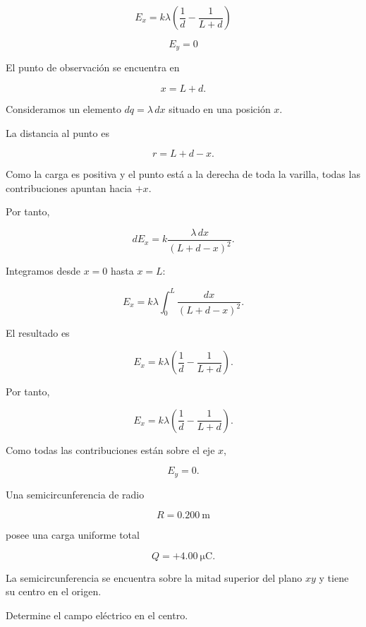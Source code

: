 \begin{respuesta}

\[
\boxed{
E_x=k\lambda\left(\frac{1}{d}-\frac{1}{L+d}\right)
}
\]

\[
\boxed{E_y=0}
\]

\end{respuesta}

\begin{explicacion}

El punto de observación se encuentra en

\[
x=L+d.
\]

Consideramos un elemento \(dq=\lambda\,dx\) situado en una posición \(x\).

La distancia al punto es

\[
r=L+d-x.
\]

Como la carga es positiva y el punto está a la derecha de toda la varilla, todas las contribuciones apuntan hacia \(+x\).

Por tanto,

\[
dE_x=k\frac{\lambda\,dx}{(L+d-x)^2}.
\]

Integramos desde \(x=0\) hasta \(x=L\):

\[
E_x=
k\lambda
\int_0^L
\frac{dx}{(L+d-x)^2}.
\]

El resultado es

\[
E_x=
k\lambda
\left(
\frac{1}{d}
-
\frac{1}{L+d}
\right).
\]

Por tanto,

\[
\boxed{
E_x=k\lambda\left(\frac{1}{d}-\frac{1}{L+d}\right)
}.
\]

Como todas las contribuciones están sobre el eje \(x\),

\[
\boxed{E_y=0}.
\]

\end{explicacion}


\begin{ejercicio}

Una semicircunferencia de radio

\[
R=\SI{0.200}{\metre}
\]

posee una carga uniforme total

\[
Q=+\SI{4.00}{\micro\coulomb}.
\]

La semicircunferencia se encuentra sobre la mitad superior del plano \(xy\) y tiene su centro en el origen.

Determine el campo eléctrico en el centro.

\end{ejercicio}

